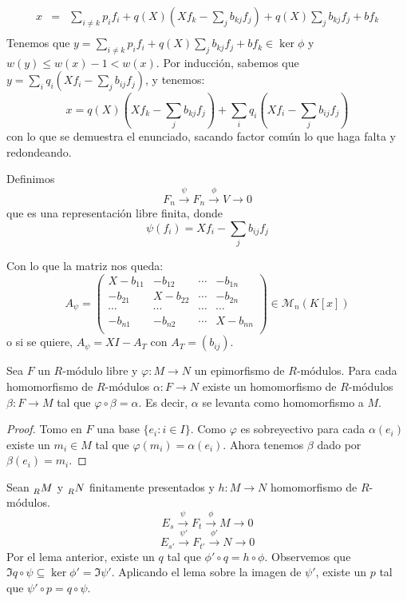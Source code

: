 \begin{ejemplo}
  \begin{eqnarray*}
    x&=&\sum_{i\neq k} p_i f_i +q(X)(Xf_k-\sum_j b_{kj}f_j)
         +q(X)\sum_j b_{kj}f_j+bf_k\\
  \end{eqnarray*}
  Tenemos que \(y=\sum_{i\neq k} p_i f_i+q(X)\sum_j b_{kj}f_j+bf_k\in\ker\phi\)
  y \(w(y)\le w(x)-1<w(x)\). Por inducción, sabemos que \(y=\sum_i q_i (Xf_i
  -\sum_j b_{ij}f_j)\),
  y tenemos:
  \[
    x= q(X)(Xf_k-\sum_j b_{kj}f_j)+\sum_i q_i (Xf_i
    -\sum_j b_{ij}f_j)
  \]
  con lo que se demuestra el enunciado, sacando factor común lo que haga
  falta y redondeando.

  Definimos
  \[
    F_n\overset{\psi}{\longrightarrow} F_n\overset{\phi}{\longrightarrow}
    V\longrightarrow 0
  \]
  que es una representación libre finita, donde
  \[
    \psi(f_i)=Xf_i-\sum_j b_{ij}f_j
  \]

  Con lo que la matriz nos queda:
  \[
    A_\psi=
    \begin{pmatrix}
      X-b_{11}  & -b_{12}&\cdots&-b_{1n}\\
      -b_{21}  & X-b_{22}&\cdots&-b_{2n}\\
      \cdots&\cdots&\cdots&\cdots\\
      -b_{n1}  & -b_{n2}&\cdots&X-b_{nn}\\
    \end{pmatrix}\in\mathcal{M}_n(K[x])
  \]
  o si se quiere, \(A_\psi=XI-A_T\) con \(A_T=(b_{ij})\).
\end{ejemplo}

\begin{lema}
  Sea \(F\) un \(R\)-módulo libre y \(\varphi:M\longrightarrow N\) un
  epimorfismo de \(R\)-módulos. Para cada homomorfismo de \(R\)-módulos
  \(\alpha:F\longrightarrow N\) existe un homomorfismo de \(R\)-módulos
  \(\beta: F\longrightarrow M\) tal que \(\varphi\circ\beta=\alpha\).
  Es decir, \(\alpha\) se levanta como homomorfismo a \(M\).
\end{lema}
\begin{proof}
  Tomo en \(F\) una base \(\{e_i:i\in I\}\). Como \(\varphi\) es sobreyectivo
  para cada \(\alpha(e_i)\) existe un \(m_i\in M\) tal que \(\varphi(m_i)
  =\alpha(e_i)\).
  Ahora tenemos \(\beta\) dado por \(\beta(e_i)=m_i\).

\end{proof}

Sean \(\prescript{}{R}{M}\) y \(\prescript{}{R}{N}\) finitamente
presentados y \(h:M\longrightarrow N\) homomorfismo de \(R\)-módulos.
\[
  E_s\overset{\psi}{\longrightarrow}
  F_t\overset{\phi}{\longrightarrow} M\longrightarrow 0
\]
\[
  E_{s'}\overset{\psi'}{\longrightarrow}
  F_{t'}\overset{\phi'}{\longrightarrow} N\longrightarrow 0
\]
Por el lema anterior, existe un \(q\) tal que \(\phi'\circ q=h\circ\phi\).
Observemos que \(\Im q\circ\psi\subseteq \ker\phi'=\Im\psi'\).
Aplicando el lema sobre la imagen de \(\psi'\), existe un
\(p\) tal que \(\psi'\circ p=q\circ\psi\).



